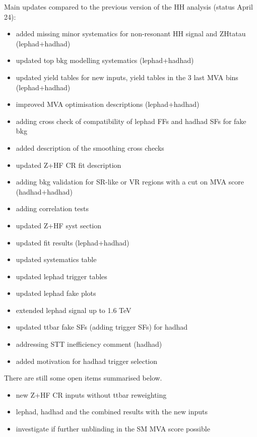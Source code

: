 Main updates compared to the previous version of the HH analysis (status April 24):
\begin{itemize}
\item added missing minor systematics for non-resonant HH signal and ZHtatau (lephad+hadhad)
\item updated top bkg modelling systematics (lephad+hadhad)
\item updated yield tables for new inputs, yield tables in the 3 last MVA bins (lephad+hadhad)
\item improved MVA optimisation descriptions (lephad+hadhad)
\item adding cross check of compatibility of lephad FFs and hadhad SFs for fake bkg
\item added description of the smoothing cross checks
\item updated Z+HF CR fit description
\item adding bkg validation for SR-like or VR regions with a cut on MVA score (hadhad+hadhad)
\item adding correlation tests 
\item updated Z+HF syst section
\item updated fit results (lephad+hadhad)
\item updated systematics table
\item updated lephad trigger tables
\item updated lephad fake plots
\item extended lephad signal up to 1.6 TeV
\item updated ttbar fake SFs (adding trigger SFs) for hadhad
\item addressing STT inefficiency comment (hadhad)
\item added motivation for hadhad trigger selection
\end{itemize}

There are still some open items summarised below.
\begin{itemize}
\item new Z+HF CR inputs without ttbar reweighting
\item lephad, hadhad and the combined results with the new inputs
\item investigate if further unblinding in the SM MVA score possible 
\end{itemize}


